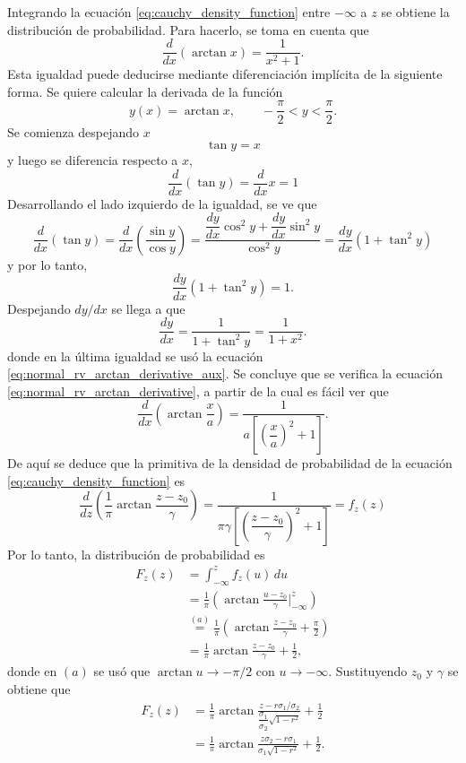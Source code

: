 \documentclass[a4paper]{report}
\begin{document}
Integrando la ecuación \ref{eq:cauchy_density_function} entre \(-\infty\) a \(z\) se obtiene la distribución de probabilidad. Para hacerlo, se toma en cuenta que 
\begin{equation}\label{eq:normal_rv_arctan_derivative}
 \frac{d}{dx}(\arctan x)=\frac{1}{x^2+1}.
\end{equation}
Esta igualdad puede deducirse mediante diferenciación implícita de la siguiente forma. Se quiere calcular la derivada de la función
\[
 y(x)=\arctan x,\qquad-\frac{\pi}{2}<y<\frac{\pi}{2}.
\]
Se comienza despejando \(x\)
\begin{equation}\label{eq:normal_rv_arctan_derivative_aux}
 \tan y=x
\end{equation}
y luego se diferencia respecto a \(x\),
\[
 \frac{d}{dx}(\tan y)=\frac{d}{dx}x=1
\]
Desarrollando el lado izquierdo de la igualdad, se ve que
\[
 \frac{d}{dx}(\tan y)=\frac{d}{dx}\left(\frac{\sin y}{\cos y}\right)
 =\frac{\dfrac{dy}{dx}\cos^2y+\dfrac{dy}{dx}\sin^2y}{\cos^2y}
 =\dfrac{dy}{dx}\left(1+\tan^2y\right)
\]
y por lo tanto,
\[
 \dfrac{dy}{dx}\left(1+\tan^2y\right)=1.
\]
Despejando \(dy/dx\) se llega a que
\[
 \frac{dy}{dx}=\frac{1}{1+\tan^2y}=\frac{1}{1+x^2}.
\]
donde en la última igualdad se usó la ecuación \ref{eq:normal_rv_arctan_derivative_aux}. Se concluye que se verifica la ecuación \ref{eq:normal_rv_arctan_derivative}, a partir de la cual es fácil ver que
\[
 \frac{d}{dx}\left(\arctan \frac{x}{a}\right)=\frac{1}{a\left[\left(\dfrac{x}{a}\right)^2+1\right]}.
\]
De aquí se deduce que la primitiva de la densidad de probabilidad de la ecuación 
\ref{eq:cauchy_density_function} es
\[
 \frac{d}{dz}\left(\frac{1}{\pi}\arctan \frac{z-z_0}{\gamma}\right)
  =\dfrac{1}{\pi\gamma\left[\left(\dfrac{z-z_0}{\gamma}\right)^2+1\right]}=f_z(z)
\]
Por lo tanto, la distribución de probabilidad es
\begin{align*}
 F_z(z)&=\int_{-\infty}^zf_z(u)\,du\\
   &=\frac{1}{\pi}\left(\arctan \frac{u-z_0}{\gamma}\bigg|_{-\infty}^{z}\right)\\
   &\overset{(a)}{=}\frac{1}{\pi}\left(\arctan \frac{z-z_0}{\gamma}+\frac{\pi}{2}\right)\\
   &=\frac{1}{\pi}\arctan \frac{z-z_0}{\gamma}+\frac{1}{2},
\end{align*}
donde en \((a)\) se usó que \(\arctan u\to-\pi/2\) con \(u\to-\infty\).
Sustituyendo \(z_0\) y \(\gamma\) se obtiene que
\begin{align*}
 F_z(z)&=\frac{1}{\pi}\arctan \frac{z-r\sigma_1/\sigma_2}{\dfrac{\sigma_1}{\sigma_2}\sqrt{1-r^2}}+\frac{1}{2}\\
   &=\frac{1}{\pi}\arctan \frac{z\sigma_2-r\sigma_1}{\sigma_1\sqrt{1-r^2}}+\frac{1}{2}.
\end{align*}
\end{document}
